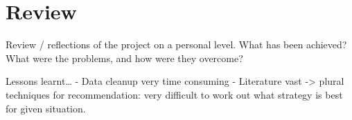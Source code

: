 \section{Review}\label{review}
Review / reflections of the project on a personal level. What has been achieved? What were the problems, and how were they overcome?

Lessons learnt\ldots
 - Data cleanup very time consuming
 - Literature vast -> plural techniques for recommendation: very difficult to work out what strategy is best for given situation.

